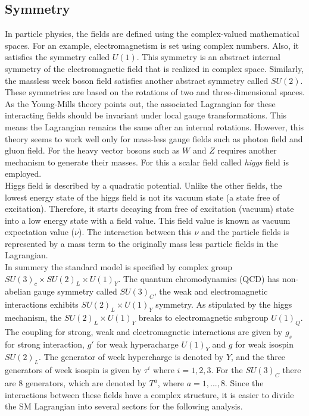 \subsection{Symmetry}\label{symmetry}
In particle physics, the fields are defined using the complex-valued mathematical spaces. For an example, electromagnetism is set using complex numbers. Also, it satisfies the symmetry called $U(1)$. This symmetry is an abstract internal symmetry of the electromagnetic field that is realized in complex space. Similarly, the massless week boson field satisfies another abstract symmetry called $SU(2)$. These symmetries are based on the rotations of two and three-dimensional spaces.\\
As the Young-Mills theory \cite{Yang:1954ek} points out, the associated Lagrangian for these interacting fields should be invariant under local gauge transformations. This means the Lagrangian remains the same after an internal rotations. However, this theory seems to work well only for mass-less gauge fields such as photon field and gluon field. For the heavy vector bosons such as $W$ and $Z$ requires another mechanism to generate their masses. For this a scalar field called \textit{higgs} field is employed.\\
Higgs field is described by a quadratic potential. Unlike the other fields, the lowest energy state of the higgs field is not its vacuum state (a state free of excitation). Therefore, it starts decaying from free of excitation (vacuum) state into a low energy state with a field value. This field value is known as vacuum expectation value ($\nu$). The interaction between this $\nu$ and the particle fields is represented by a mass term to the originally mass less particle fields in the Lagrangian. \\
In summery the standard model is specified by complex group $SU(3)_c\times SU(2)_L\times U(1)_Y$. The quantum chromodynamics (QCD) has non-abelian gauge symmetry called $SU(3)_C$, the weak and electromagnetic interactions exhibits $SU(2)_L\times U(1)_Y$ symmetry.  As stipulated by the higgs mechanism, the $SU(2)_L\times U(1)_Y$ breaks to electromagnetic subgroup $U(1)_Q$. The coupling for strong, weak and electromagnetic interactions are given by $g_s$ for strong interaction, $g'$ for weak hyperacharge $U(1)_Y$ and $g$ for weak isospin $SU(2)_L$. The generator of week hypercharge is denoted by $Y$, and the three generators of week isospin is given by $\tau^i$ where $i=1,2,3$. For the $SU(3)_C$ there are 8 generators, which are denoted by $T^a$, where $a=1,...,8$. Since the interactions between these fields have a complex structure, it is easier to divide the SM Lagrangian into several sectors for the following analysis.

